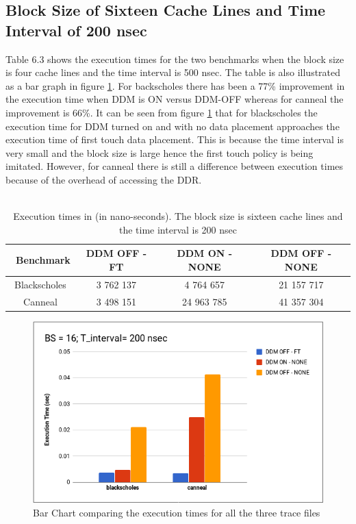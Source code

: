 \documentclass{listhesis}
\begin{document}
\subsection{Block Size of Sixteen Cache Lines and Time Interval of 200 nsec}
Table 6.3 shows the execution times for the two benchmarks when the block size is four cache lines and the time interval is 500 nsec. The table is also illustrated as a bar graph in figure \ref{fig:BS_16_T_200.png}. For backscholes there has been a 77\% improvement in the execution time when DDM is ON versus DDM-OFF whereas for canneal the improvement is 66\%. It can be seen from figure \ref{fig:BS_16_T_200.png} that for blackscholes the execution time for DDM turned on and with no data placement approaches the execution time of first touch data placement. This is because the time interval is very small and the block size is large hence the first touch policy is being imitated. However, for canneal there is still a difference between execution times because of the overhead of accessing the DDR. \\
\\
\begin{table}[h!]
\begin{center}
 \begin{tabular}{|| c | c | c | c||} 
 \hline
 \ \textbf{Benchmark} & \textbf{DDM OFF - FT}  & \textbf{DDM ON - NONE}  & \textbf{DDM OFF - NONE}\\ [0.5 ex] 
 \hline\hline
  Blackscholes   &   3 762 137   &   4 764 657	    &  21 157 717 \\ 
 \hline
   Canneal  	&   3 498 151    &   24 963 785   	&   41 357 304   \\
 \hline
\end{tabular}
 \caption{Execution times in (in nano-seconds). The block size is sixteen cache lines and the time interval is 200 nsec}
 \label{table:ExecTimes3}
\end{center}
\end{table}

\begin{figure}
  \includegraphics[width=\linewidth]{BS_16_T_200.png}
  \centering
  \caption{Bar Chart comparing the execution times for all the three trace files}
  \label{fig:BS_16_T_200.png}
\end{figure}
\end{document}
